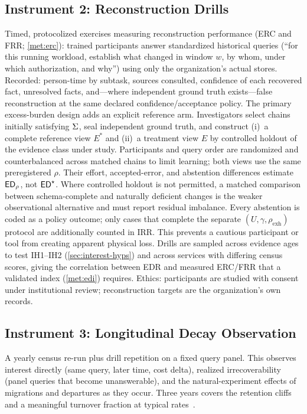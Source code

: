 \subsection{Instrument 2: Reconstruction Drills}
Timed, protocolized exercises measuring reconstruction performance (ERC and FRR;
\cref{met:erc}): trained
participants answer standardized historical queries (``for this running workload,
establish what changed in window $w$, by whom, under which authorization, and
why'') using only the organization's actual stores. Recorded: person-time by
subtask, sources consulted, confidence of each recovered fact, unresolved facts,
and---where independent ground truth exists---false reconstruction at the same
declared confidence/acceptance policy.
The primary excess-burden design adds an explicit reference arm. Investigators
select chains initially satisfying $\Sigma$, seal independent ground truth, and
construct (i)~a complete reference view $E^{*}$ and (ii)~a treatment view $E$ by
controlled holdout of the evidence class under study. Participants and query order
are randomized and counterbalanced across matched chains to limit learning; both
views use the same preregistered $\rho$. Their effort, accepted-error, and abstention
differences estimate $\mathsf{ED}_\rho$, not $\mathsf{ED}^{\star}$. Where controlled holdout is not
permitted, a matched comparison between schema-complete and naturally deficient
changes is the weaker observational alternative and must report residual imbalance.
Every abstention is coded as a policy outcome; only cases that complete the separate
$(U,\gamma,\rho_{\mathrm{exh}})$ protocol are additionally counted in IRR. This
prevents a cautious participant or tool from creating apparent physical loss.
Drills are sampled across evidence ages to test IH1--IH2 (\cref{sec:interest-hyps})
and across services with differing census scores, giving the correlation between
EDR and measured ERC/FRR that a validated index (\cref{met:edi}) requires.
Ethics: participants are studied with consent under institutional review;
reconstruction targets are the organization's own records.

\subsection{Instrument 3: Longitudinal Decay Observation}
A yearly census re-run plus drill repetition on a fixed query panel. This observes
interest directly (same query, later time, cost delta), realized irrecoverability
(panel queries that become unanswerable), and the natural-experiment effects of
migrations and departures as they occur. Three years covers the retention cliffs
and a meaningful turnover fraction at typical rates~\cite{rigby2016}.

